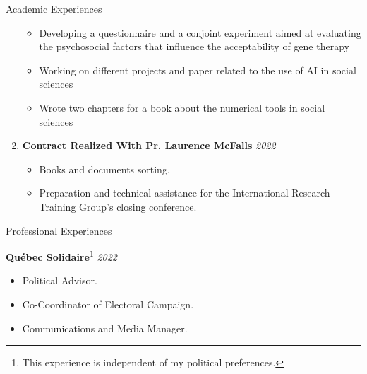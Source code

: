 \documentclass{resume} %
\begin{document}
\begin{rSection}{Academic Experiences}
\begin{enumerate}
\begin{itemize}
            \item Developing a questionnaire and a conjoint experiment aimed at evaluating the psychosocial factors that influence the acceptability of gene therapy
            \item Working on different projects and paper related to the use of AI in social sciences
            \item Wrote two chapters for a book about the numerical tools in social sciences
        \end{itemize}
    \item \textbf{Contract Realized With Pr. Laurence McFalls} \hfill {\em 2022}
        \begin{itemize}
            \item Books and documents sorting.
            \item Preparation and technical assistance for the International Research Training Group's closing conference.
        \end{itemize}
\end{enumerate}

\end{rSection}

\begin{rSection}{Professional Experiences}

{\bf Québec Solidaire}\footnote{This experience is independent of my political preferences.}  \hfill {\em 2022}
\begin{itemize}
    \item Political Advisor.
    \item Co-Coordinator of Electoral Campaign.
    \item Communications and Media Manager.
\end{itemize}

\end{rSection}

\end{document}
